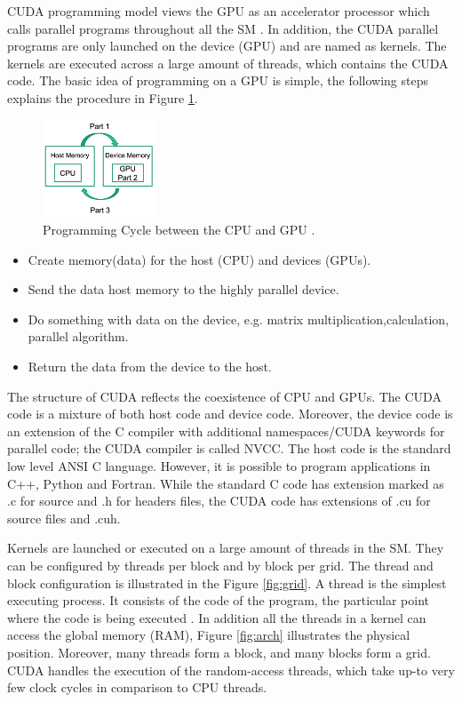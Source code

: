 CUDA programming model views the GPU as an accelerator processor which calls parallel programs throughout all the SM \cite{handbook}. In addition, the CUDA parallel programs are only launched on the device (GPU) and are named as kernels. The kernels are executed across a large amount of threads, which contains the CUDA code. The basic idea of programming on a GPU is simple, the following steps explains the procedure in Figure \ref{fig:cycle}.

\begin{figure}[htbp]
	\centering
		\includegraphics[width=0.3\textwidth]{Figures/cycle.png}
		\smallskip
	\caption[Programming cycle]{Programming Cycle between the CPU and GPU \cite{example}.}
	\label{fig:cycle}
\end{figure}

\begin{itemize}
\item Create memory(data) for the host (CPU) and devices (GPUs).
\item Send the data host memory to the highly parallel device.
\item Do something with data on the device, e.g. matrix multiplication,calculation, parallel algorithm.
\item Return the data from the device to the host.
\end{itemize}

The structure of CUDA reflects the coexistence of CPU and GPUs. The CUDA code is a mixture of both host code and device code. Moreover, the device code is an extension of the C compiler with additional namespaces/CUDA keywords for parallel code; the CUDA compiler is called NVCC. The host code is the standard low level ANSI C language. However, it is possible to program applications in C++, Python and Fortran. While the standard C code has extension marked as .c for source and .h for headers files, the CUDA code has extensions of .cu for source files and .cuh.

Kernels are launched or executed on a large amount of threads in the SM. They can be configured by threads per block and by block per grid. The thread and block configuration is illustrated in the Figure \ref{fig:grid}. A thread is the simplest executing process. It consists of the code of the program, the particular point where the code is being executed \cite{hwu}. In addition all the threads in a kernel can access the global memory (RAM), Figure  \ref{fig:arch} illustrates the physical position. Moreover, many threads form a block, and many blocks form a grid. CUDA handles the execution of the random-access threads, which take up-to very few clock cycles in comparison to CPU threads.

